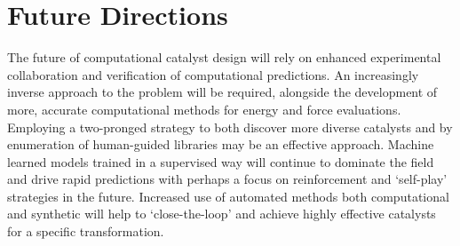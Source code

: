 \documentclass[../main.tex]{subfiles}
\begin{document}


\section{Future Directions}

The future of computational catalyst design will rely on enhanced experimental collaboration and verification of computational predictions. An increasingly inverse approach to the problem will be required, alongside the development of more, accurate computational methods for energy and force evaluations. Employing a two-pronged strategy to both discover more diverse catalysts and by enumeration of human-guided libraries may be an effective approach. Machine learned models trained in a supervised way will continue to dominate the field and drive rapid predictions with perhaps a focus on reinforcement and `self-play' strategies in the future. Increased use of automated methods both computational and synthetic will help to `close-the-loop' and achieve highly effective catalysts for a specific transformation.





\clearpage
\end{document}
